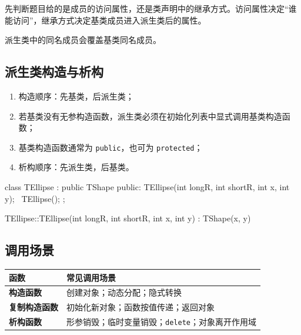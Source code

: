 \documentclass[UTF8,fontset=fandol,zihao=5]{ctexart}
\newcommand{\code}[1]{\texttt{#1}}
\begin{document}
\begin{method}[区分访问属性与继承方式]
先判断题目给的是成员的访问属性，还是类声明中的继承方式。访问属性决定“谁能访问”，继承方式决定基类成员进入派生类后的属性。
\end{method}

派生类中的同名成员会覆盖基类同名成员。

\subsection{派生类构造与析构}

\begin{enumerate}
  \item 构造顺序：先基类，后派生类；
  \item 若基类没有无参构造函数，派生类必须在初始化列表中显式调用基类构造函数；
  \item 基类构造函数通常为 \code{public}，也可为 \code{protected}；
  \item 析构顺序：先派生类，后基类。
\end{enumerate}

\begin{cppcode}[派生类构造函数]
class TEllipse : public TShape {
public:
    TEllipse(int longR, int shortR, int x, int y);
    ~TEllipse();
};

TEllipse::TEllipse(int longR, int shortR, int x, int y)
    : TShape(x, y) {
}
\end{cppcode}

\subsection{调用场景}

\begin{center}
\begin{tabularx}{0.92\textwidth}{>{\bfseries}p{3cm}X}
\toprule
函数 & 常见调用场景 \\
\midrule
构造函数 & 创建对象；动态分配；隐式转换 \\
复制构造函数 & 初始化新对象；函数按值传递；返回对象 \\
析构函数 & 形参销毁；临时变量销毁；\code{delete}；对象离开作用域 \\
\bottomrule
\end{tabularx}
\end{center}
\end{document}

